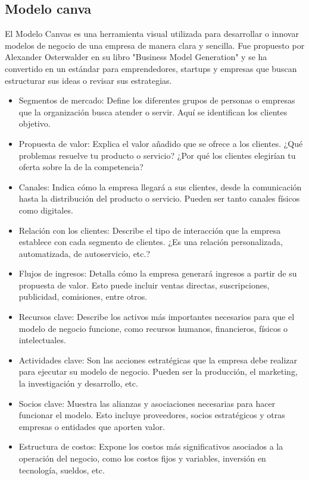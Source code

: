 \subsection{Modelo canva}
El Modelo Canvas es una herramienta visual utilizada para desarrollar o innovar modelos de negocio de una empresa de manera clara y sencilla. Fue propuesto por Alexander Osterwalder en su libro "Business Model Generation" y se ha convertido en un estándar para emprendedores, startups y empresas que buscan estructurar sus ideas o revisar sus estrategias.
\begin{itemize}
    \item Segmentos de mercado: Define los diferentes grupos de personas o empresas que la organización busca atender o servir. Aquí se identifican los clientes objetivo.
    \item Propuesta de valor: Explica el valor añadido que se ofrece a los clientes. ¿Qué problemas resuelve tu producto o servicio? ¿Por qué los clientes elegirían tu oferta sobre la de la competencia?
    \item Canales: Indica cómo la empresa llegará a sus clientes, desde la comunicación hasta la distribución del producto o servicio. Pueden ser tanto canales físicos como digitales.
    \item Relación con los clientes: Describe el tipo de interacción que la empresa establece con cada segmento de clientes. ¿Es una relación personalizada, automatizada, de autoservicio, etc.?
    \item Flujos de ingresos: Detalla cómo la empresa generará ingresos a partir de su propuesta de valor. Esto puede incluir ventas directas, suscripciones, publicidad, comisiones, entre otros.
    \item Recursos clave: Describe los activos más importantes necesarios para que el modelo de negocio funcione, como recursos humanos, financieros, físicos o intelectuales.
    \item Actividades clave: Son las acciones estratégicas que la empresa debe realizar para ejecutar su modelo de negocio. Pueden ser la producción, el marketing, la investigación y desarrollo, etc.
    \item Socios clave: Muestra las alianzas y asociaciones necesarias para hacer funcionar el modelo. Esto incluye proveedores, socios estratégicos y otras empresas o entidades que aporten valor.
    \item Estructura de costos: Expone los costos más significativos asociados a la operación del negocio, como los costos fijos y variables, inversión en tecnología, sueldos, etc.
\end{itemize}

